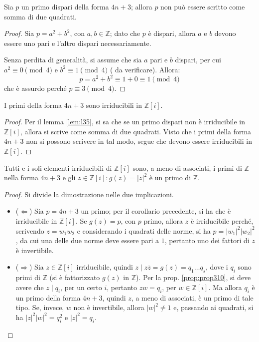 \documentclass[11pt, a4paper]{scrartcl}
\theoremstyle{definition}
\numberwithin{esempio}{section}
\theoremstyle{definition}
\numberwithin{obs}{section}
\numberwithin{nota}{section}
\numberwithin{equation}{subsection}
\begin{document}
\begin{teorema}
	{}{}
	Sia $p$ un primo dispari della forma $4n +3$; allora $p$ non pu\`o essere scritto come somma di due quadrati.
	\begin{proof}
		Sia $p = a^2 + b^2$, con $a,b \in \mathbb{Z}$; dato che $p$ \`e dispari, allora $a$ e $b$ devono essere uno pari e l'altro dispari necessariamente.
		
		Senza perdita di generalit\`a, si assume che sia $a$ pari e $b $ dispari, per cui $a^2 \equiv 0 \pmod{4}$ e $b^2 \equiv 1 \pmod{4} $ ({\color{red} da verificare}). 
		Allora:
		\[
		p = a^2 + b^2 \equiv 1 + 0 \equiv 1 \pmod{4} 
		\] 
		che \`e assurdo perch\'e $p\equiv 3 \pmod{4} $.
	\end{proof}
\end{teorema}
\begin{corollario}
	{}{}
	I primi della forma $4n +3 $ sono irriducibili in $\mathbb{Z}[i]$.
	\begin{proof}
		Per il lemma \ref{lem:l35}, si sa che se un primo dispari non \`e irriducibile in $\mathbb{Z}[i]$, allora si scrive come somma di due quadrati.
		Visto che i primi della forma $4n + 3$ non si possono scrivere in tal modo, segue che devono essere irriducibili in $\mathbb{Z}[i]$.
	\end{proof}
\end{corollario}
\begin{teorema}
	{}{}
	Tutti e i soli elementi irriducibili di $\mathbb{Z}[i]$ sono, a meno di associati, i primi di $\mathbb{Z}$ nella forma $4n+3$ e gli $z \in \mathbb{Z}[i]: g(z) = \lvert z \rvert ^2$ \`e un primo di $\mathbb{Z}$.
	\begin{proof}
		Si divide la dimostrazione nelle due implicazioni.
		\begin{itemize}
			\item ($\Leftarrow$) Sia $p = 4n+3$ un primo; per il corollario precedente, si ha che \`e irriducibile in $\mathbb{Z}[i]$.
				Se $g(z) = p$, con $p$ primo, allora $z $ \`e irriducibile perch\'e, scrivendo $z = w_1w_2$ e considerando i quadrati delle norme, si ha $p = \lvert w_1 \rvert ^2 \lvert w_2 \rvert ^2$, da cui una delle due norme deve essere pari a $1$, pertanto uno dei fattori di $z$ \`e invertibile.
			\item ($\Rightarrow $) Sia $z \in \mathbb{Z}[i]$ irriducibile, quindi $z  \mid z \overline{z}= g(z) = q_1 \ldots q_s$, dove i $q_i$ sono primi di $\mathbb{Z}$ (si \`e fattorizzato $g(z)$ in $\mathbb{Z}$).
				Per la prop. \ref{prop:prop310}, si deve avere che $z  \mid q_i$, per un certo $i$, pertanto $zw = q_i$, per $w \in \mathbb{Z}[i]$.
				Ma allora $q_i$ \`e un primo della forma $4n + 3$, quindi $z$, a meno di associati, \`e un primo di tale tipo.
				Se, invece, $w$ non \`e invertibile, allora $\lvert w \rvert ^2 \neq 1$ e, passando ai quadrati, si ha $\lvert z \rvert ^2 \lvert w \rvert ^2 = q_i^2$ e $\lvert z \rvert ^2= q_i$.
		\end{itemize}
	\end{proof}
\end{teorema}
\end{document}
